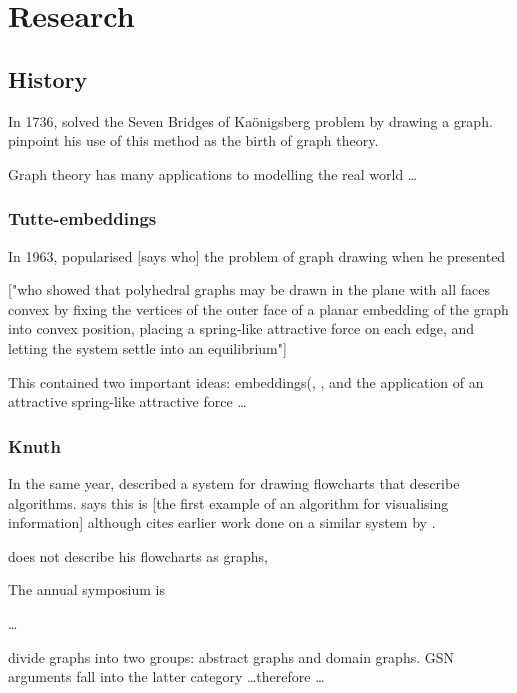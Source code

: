 \chapter{Research}


\section{History}

In 1736, \citet{euler} solved the Seven Bridges of Ka\"{o}nigsberg problem by drawing a graph.
\citet{ismail2009some}
pinpoint his use of this method as the birth of graph theory.

Graph theory has many applications to modelling the real world \ldots

\subsection{Tutte-embeddings}

In 1963, \citet{tutte} popularised [says who] the problem of graph drawing when he presented 

["who showed that polyhedral graphs may be drawn in the plane with all faces convex by fixing the vertices of the outer face of a planar embedding of the graph into convex position, placing a spring-like attractive force on each edge, and letting the system settle into an equilibrium"]

This contained two important ideas: embeddings(, , and the application of an attractive spring-like attractive force \ldots 

\subsection{Knuth}

In the same year, \citet{Knuth63} described a system for drawing flowcharts that describe algorithms. \citet{battista}  says this is [the first example of an algorithm for visualising information] although \citeauthor{Knuth63} cites earlier work done on a similar system by \citet{haibt1959}.

\citet{Knuth63} does not describe his flowcharts as graphs,

The annual symposium is 


\ldots

\citet{huang2007effects} divide graphs into two groups: abstract graphs and domain graphs.
GSN arguments fall into the latter category \ldots  therefore \ldots
{}







